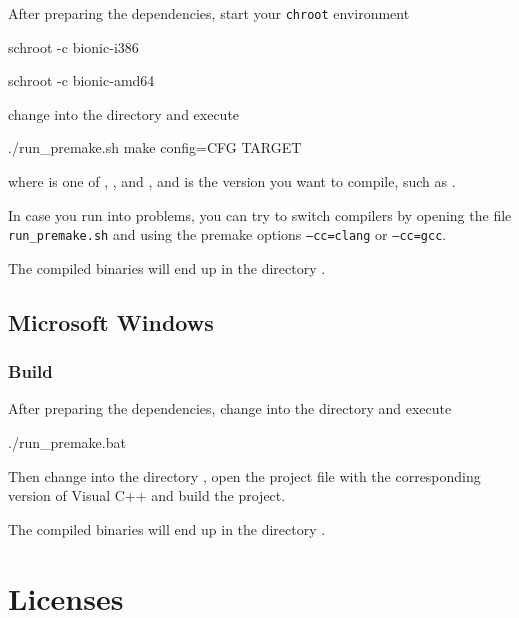 After preparing the dependencies, start your \texttt{chroot}
environment

\begin{Verbatim32}
  schroot -c bionic-i386
\end{Verbatim32}

\begin{Verbatim64}
  schroot -c bionic-amd64
\end{Verbatim64}

change into the directory  and execute

\begin{VerbatimBoth}
  ./run_premake.sh
  make config=CFG TARGET
\end{VerbatimBoth}

where  is one of ,
,  and
, and  is the version
you want to compile, such as .

In case you run into problems, you can try to switch compilers by
opening the file \texttt{run\_premake.sh} and using the premake
options \texttt{--cc=clang} or \texttt{--cc=gcc}.

The compiled binaries will end up in the directory .

\section{Microsoft Windows}

\subsection{Build}

After preparing the dependencies, change into the directory
 and execute

\begin{VerbatimBoth}
  ./run_premake.bat
\end{VerbatimBoth}

Then change into the directory , open the
project file with the corresponding version of Visual C++ and build
the project.

The compiled binaries will end up in the directory .

\chapter{Licenses}

\scriptsize

\normalsize

\scriptsize

\normalsize




